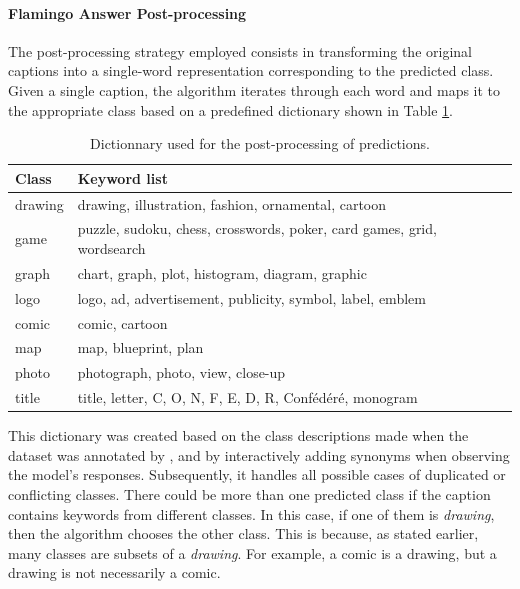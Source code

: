 
\paragraph{Flamingo Answer Post-processing} The post-processing strategy employed consists in transforming the original captions into a single-word representation corresponding to the predicted class. Given a single caption, the algorithm iterates through each word and maps it to the appropriate class based on a predefined dictionary shown in Table \ref{tab:dic}. 

\begin{table}[ht]
    \centering
    \begin{tabular}{|l|l|}
        \hline
        \textbf{Class} & \textbf{Keyword list} \\
        \hline
        drawing & drawing, illustration, fashion, ornamental, cartoon \\
        \hline
        game & puzzle, sudoku, chess, crosswords, poker, card games, grid, wordsearch \\
        \hline
        graph & chart, graph, plot, histogram, diagram, graphic \\
        \hline
        logo & logo, ad, advertisement, publicity, symbol, label, emblem \\
        \hline
        comic & comic, cartoon \\
        \hline
        map & map, blueprint, plan \\
        \hline
        photo & photograph, photo, view, close-up \\
        \hline
        title & title, letter, C, O, N, F, E, D, R, Confédéré, monogram\\
        \hline
    \end{tabular}
    \caption{Dictionnary used for the post-processing of predictions.}
    \label{tab:dic}
\end{table}

This dictionary was created based on the class descriptions made when the dataset was annotated by \cite{dhlab2022impresso}, and by interactively adding synonyms when observing the model’s responses. Subsequently, it handles all possible cases of duplicated or conflicting classes. There could be more than one predicted class if the caption contains keywords from different classes. In this case, if one of them is \textit{drawing}, then the algorithm chooses the other class. This is because, as stated earlier, many classes are subsets of a \textit{drawing}. For example, a comic is a drawing, but a drawing is not necessarily a comic.

